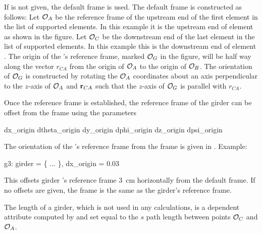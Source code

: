 If  is not given, the default  frame is used. The default 
frame is constructed as follows: Let ${\cal O}_A$ be the reference frame of the upstream end of the
first element in the list of supported elements. In this example it is the upstream end of element
 as shown in the figure. Let ${\cal O}_C$ be the downstream end of the last element in the list
of supported elements. In this example this is the downstream end of element . The origin of
the 's reference frame, marked ${\cal O}_G$ in the figure, will be half way along the vector
$r_{CA}$ from the origin of ${\cal O}_A$ to the origin of ${\cal O}_B$. The orientation of ${\cal O}_G$ is
constructed by rotating the ${\cal O}_A$ coordinates about an axis perpendicular to the $z$-axis of
${\cal O}_A$ and ${\bf r}_{CA}$ such that the $z$-axis of ${\cal O}_G$ is parallel with $r_{CA}$.

Once the  reference frame is established, the reference frame of the girder can be offset
from the  frame using the parameters
\begin{example}
  dx_origin    dtheta_origin
  dy_origin    dphi_origin
  dz_origin    dpsi_origin
\end{example} 
The orientation of the 's reference frame from the 
frame is given in . Example:
\begin{example}
  g3: girder = \{ ... \}, dx_origin = 0.03
\end{example}
This offsets girder 's reference frame 3~cm horizontally from
the default  frame. If no offsets are given, the
 frame is the same as the girder's reference frame.

The length  of a girder, which is not used in any calculations,
is a dependent attribute computed by \bmad and set equal to the $s$
path length between points ${\cal O}_C$ and ${\cal O}_A$.

